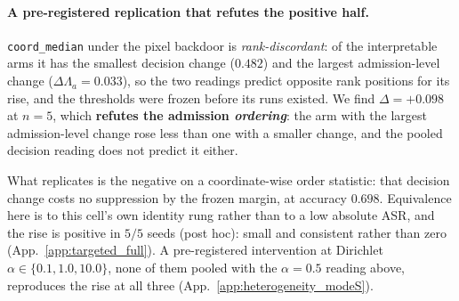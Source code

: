 \documentclass{article}
\begin{document}
\paragraph{A pre-registered replication that refutes the positive half.} \texttt{coord\_median} under the pixel backdoor is \emph{rank-discordant}: of the interpretable arms it has the smallest decision change ($0.482$) and the largest admission-level change ($\Delta\Lambda_a{=}0.033$), so the two readings predict opposite rank positions for its rise, and the thresholds were frozen before its runs existed. We find $\Delta=+0.098$ at $n{=}5$, which \textbf{refutes the admission \emph{ordering}}: the arm with the largest admission-level change rose less than one with a smaller change, and the pooled decision reading does not predict it either.

\noindent What replicates is the negative on a coordinate-wise order statistic: that decision change costs no suppression by the frozen margin, at accuracy $0.698$. Equivalence here is to this cell's own identity rung rather than to a low absolute ASR, and the rise is positive in $5/5$ seeds (post hoc): small and consistent rather than zero (App.~\ref{app:targeted_full}). A pre-registered intervention at Dirichlet $\alpha \in \{0.1,1.0,10.0\}$, none of them pooled with the $\alpha{=}0.5$ reading above, reproduces the rise at all three (App.~\ref{app:heterogeneity_modeS}).
\end{document}
